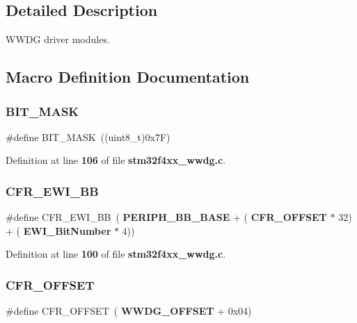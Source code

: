 \subsection{Detailed Description}
W\+W\+DG driver modules. 



\subsection{Macro Definition Documentation}
\mbox{\label{group__WWDG_ga7d4a1875576135ebdd354a816679d45c}} 
\subsubsection{B\+I\+T\+\_\+\+M\+A\+SK}
{\footnotesize\ttfamily \#define B\+I\+T\+\_\+\+M\+A\+SK~((uint8\+\_\+t)0x7\+F)}



Definition at line \textbf{ 106} of file \textbf{ stm32f4xx\+\_\+wwdg.\+c}.

\mbox{\label{group__WWDG_gaa48804210cea547f0e0f4ca49c44fc94}} 
\subsubsection{C\+F\+R\+\_\+\+E\+W\+I\+\_\+\+BB}
{\footnotesize\ttfamily \#define C\+F\+R\+\_\+\+E\+W\+I\+\_\+\+BB~(\textbf{ P\+E\+R\+I\+P\+H\+\_\+\+B\+B\+\_\+\+B\+A\+SE} + (\textbf{ C\+F\+R\+\_\+\+O\+F\+F\+S\+ET} $\ast$ 32) + (\textbf{ E\+W\+I\+\_\+\+Bit\+Number} $\ast$ 4))}



Definition at line \textbf{ 100} of file \textbf{ stm32f4xx\+\_\+wwdg.\+c}.

\mbox{\label{group__WWDG_ga3e0f9d9f7f69a6d133bba721e25aca4a}} 
\subsubsection{C\+F\+R\+\_\+\+O\+F\+F\+S\+ET}
{\footnotesize\ttfamily \#define C\+F\+R\+\_\+\+O\+F\+F\+S\+ET~(\textbf{ W\+W\+D\+G\+\_\+\+O\+F\+F\+S\+ET} + 0x04)}



